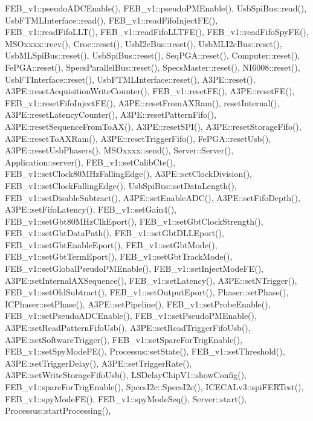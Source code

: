 F\+E\+B\+\_\+v1\+::pseudo\+A\+D\+C\+Enable(), F\+E\+B\+\_\+v1\+::pseudo\+P\+M\+Enable(), Usb\+Spi\+Bus\+::read(), Usb\+F\+T\+M\+L\+Interface\+::read(), F\+E\+B\+\_\+v1\+::read\+Fifo\+Inject\+F\+E(), F\+E\+B\+\_\+v1\+::read\+Fifo\+L\+L\+T(), F\+E\+B\+\_\+v1\+::read\+Fifo\+L\+L\+T\+F\+E(), F\+E\+B\+\_\+v1\+::read\+Fifo\+Spy\+F\+E(), M\+S\+Oxxxx\+::recv(), Croc\+::reset(), Usb\+I2c\+Bus\+::reset(), Usb\+M\+L\+I2c\+Bus\+::reset(), Usb\+M\+L\+Spi\+Bus\+::reset(), Usb\+Spi\+Bus\+::reset(), Seq\+P\+G\+A\+::reset(), Computer\+::reset(), Fe\+P\+G\+A\+::reset(), Specs\+Parallel\+Bus\+::reset(), Specs\+Master\+::reset(), N\+I6008\+::reset(), Usb\+F\+T\+Interface\+::reset(), Usb\+F\+T\+M\+L\+Interface\+::reset(), A3\+P\+E\+::reset(), A3\+P\+E\+::reset\+Acquisition\+Write\+Counter(), F\+E\+B\+\_\+v1\+::reset\+F\+E(), A3\+P\+E\+::reset\+F\+E(), F\+E\+B\+\_\+v1\+::reset\+Fifo\+Inject\+F\+E(), A3\+P\+E\+::reset\+From\+A\+X\+Ram(), reset\+Internal(), A3\+P\+E\+::reset\+Latency\+Counter(), A3\+P\+E\+::reset\+Pattern\+Fifo(), A3\+P\+E\+::reset\+Sequence\+From\+To\+A\+X(), A3\+P\+E\+::reset\+S\+P\+I(), A3\+P\+E\+::reset\+Storage\+Fifo(), A3\+P\+E\+::reset\+To\+A\+X\+Ram(), A3\+P\+E\+::reset\+Trigger\+Fifo(), Fe\+P\+G\+A\+::reset\+Usb(), A3\+P\+E\+::reset\+Usb\+Phasers(), M\+S\+Oxxxx\+::send(), Server\+::\+Server(), Application\+::server(), F\+E\+B\+\_\+v1\+::set\+Calib\+Cte(), F\+E\+B\+\_\+v1\+::set\+Clock80\+M\+Hz\+Falling\+Edge(), A3\+P\+E\+::set\+Clock\+Division(), F\+E\+B\+\_\+v1\+::set\+Clock\+Falling\+Edge(), Usb\+Spi\+Bus\+::set\+Data\+Length(), F\+E\+B\+\_\+v1\+::set\+Disable\+Subtract(), A3\+P\+E\+::set\+Enable\+A\+D\+C(), A3\+P\+E\+::set\+Fifo\+Depth(), A3\+P\+E\+::set\+Fifo\+Latency(), F\+E\+B\+\_\+v1\+::set\+Gain4(), F\+E\+B\+\_\+v1\+::set\+Gbt80\+M\+Hz\+Clk\+Eport(), F\+E\+B\+\_\+v1\+::set\+Gbt\+Clock\+Strength(), F\+E\+B\+\_\+v1\+::set\+Gbt\+Data\+Path(), F\+E\+B\+\_\+v1\+::set\+Gbt\+D\+L\+L\+Eport(), F\+E\+B\+\_\+v1\+::set\+Gbt\+Enable\+Eport(), F\+E\+B\+\_\+v1\+::set\+Gbt\+Mode(), F\+E\+B\+\_\+v1\+::set\+Gbt\+Term\+Eport(), F\+E\+B\+\_\+v1\+::set\+Gbt\+Track\+Mode(), F\+E\+B\+\_\+v1\+::set\+Global\+Pseudo\+P\+M\+Enable(), F\+E\+B\+\_\+v1\+::set\+Inject\+Mode\+F\+E(), A3\+P\+E\+::set\+Internal\+A\+X\+Sequence(), F\+E\+B\+\_\+v1\+::set\+Latency(), A3\+P\+E\+::set\+N\+Trigger(), F\+E\+B\+\_\+v1\+::set\+Old\+Subtract(), F\+E\+B\+\_\+v1\+::set\+Output\+Eport(), Phaser\+::set\+Phase(), I\+C\+Phaser\+::set\+Phase(), A3\+P\+E\+::set\+Pipeline(), F\+E\+B\+\_\+v1\+::set\+Probe\+Enable(), F\+E\+B\+\_\+v1\+::set\+Pseudo\+A\+D\+C\+Enable(), F\+E\+B\+\_\+v1\+::set\+Pseudo\+P\+M\+Enable(), A3\+P\+E\+::set\+Read\+Pattern\+Fifo\+Usb(), A3\+P\+E\+::set\+Read\+Trigger\+Fifo\+Usb(), A3\+P\+E\+::set\+Software\+Trigger(), F\+E\+B\+\_\+v1\+::set\+Spare\+For\+Trig\+Enable(), F\+E\+B\+\_\+v1\+::set\+Spy\+Mode\+F\+E(), Processus\+::set\+State(), F\+E\+B\+\_\+v1\+::set\+Threshold(), A3\+P\+E\+::set\+Trigger\+Delay(), A3\+P\+E\+::set\+Trigger\+Rate(), A3\+P\+E\+::set\+Write\+Storage\+Fifo\+Usb(), L\+S\+Delay\+Chip\+V1\+::show\+Config(), F\+E\+B\+\_\+v1\+::spare\+For\+Trig\+Enable(), Specs\+I2c\+::\+Specs\+I2c(), I\+C\+E\+C\+A\+Lv3\+::spi\+F\+E\+R\+Test(), F\+E\+B\+\_\+v1\+::spy\+Mode\+F\+E(), F\+E\+B\+\_\+v1\+::spy\+Mode\+Seq(), Server\+::start(), Processus\+::start\+Processing(), 